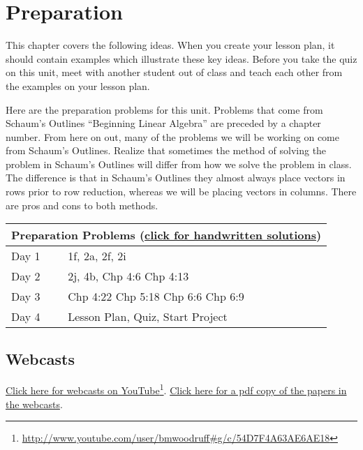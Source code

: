 \section{Preparation}

\noindent
This chapter covers the following ideas. When you create your lesson plan, it should contain examples which illustrate these key ideas. Before you take the quiz on this unit, meet with another student out of class and teach each other from the examples on your lesson plan. 



Here are the preparation problems for this unit.  Problems that come from Schaum's Outlines ``Beginning Linear Algebra'' are preceded by a chapter number. From here on out, many of the problems we will be working on come from Schaum's Outlines.  Realize that sometimes the method of solving the problem in Schaum's Outlines will differ from how we solve the problem in class. The difference is that in Schaum's Outlines they almost always place vectors in rows prior to row reduction, whereas we will be placing vectors in columns. There are pros and cons to both methods. 


\begin{center}
\begin{tabular}{ll}
\multicolumn{2}{c}{Preparation Problems
  (\href{http://ilearn.byui.edu/bbcswebdav/institution/Physical\_Sci\_Eng/Mathematics/Personal\%20Folders/WoodruffB/341/3-Patterns-Preparation-Solutions.pdf}{click
    for handwritten solutions})}
\\
\hline\hline
Day 1&
1f,
2a,
2f,
2i
\\ \hline
Day 2&
2j,
4b,
Chp 4:6
Chp 4:13
\\ \hline
Day 3&
Chp 4:22
Chp 5:18
Chp 6:6
Chp 6:9
\\ \hline
Day 4&
Lesson Plan,
Quiz, Start Project 
\\ \hline
\end{tabular}
\end{center}


\subsection{Webcasts}

\href{http://www.youtube.com/user/bmwoodruff#g/c/54D7F4A63AE6AE18}{Click
  here for webcasts on YouTube}\footnote{\url{http://www.youtube.com/user/bmwoodruff#g/c/54D7F4A63AE6AE18}}.  \href{http://ilearn.byui.edu/bbcswebdav/institution/Physical\_Sci\_Eng/Mathematics/Personal\%20Folders/WoodruffB/341/3-Patterns-videos.pdf}{Click
  here for a pdf copy of the papers in the webcasts}.

